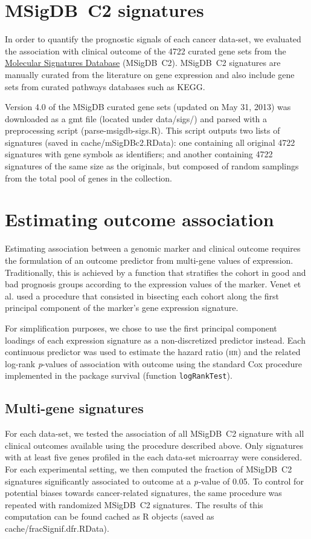 \section{\mbox{MSigDB C2} signatures}
In order to quantify the prognostic signals of each cancer data-set, we
evaluated the association with clinical outcome of the 4722 curated gene sets
from the \href{http://www.broadinstitute.org/gsea/msigdb/index.jsp}{Molecular
  Signatures Database} (\mbox{MSigDB C2}).  \mbox{MSigDB C2} signatures are
manually curated from the literature on gene expression and also include gene
sets from curated pathways databases such as KEGG.\@

Version 4.0 of the MSigDB curated gene sets (updated on May 31, 2013) was
downloaded as a \textsf{gmt} file (located under \textsf{data/sigs/}) and parsed
with a preprocessing script (\textsf{parse-msigdb-sigs.R}).  This script outputs
two lists of signatures (saved in \textsf{cache/mSigDBc2.RData}): one containing
all original 4722 signatures with gene symbols as identifiers; and another
containing 4722 signatures of the same size as the originals, but composed of
random samplings from the total pool of genes in the collection.

\section{Estimating outcome association}

Estimating association between a genomic marker and clinical outcome requires
the formulation of an outcome predictor from multi-gene values of expression.
Traditionally, this is achieved by a function that stratifies the cohort in good
and bad prognosis groups according to the expression values of the marker.
Venet et al.\cite{venet_most_2011} used a procedure that consisted in bisecting
each cohort along the first principal component of the marker's gene expression
signature.

For simplification purposes, we chose to use the first principal component
loadings of each expression signature as a non-discretized predictor instead.
Each continuous predictor was used to estimate the hazard ratio (\textsc{hr})
and the related log-rank \emph{p}-values of association with outcome using the
standard Cox procedure implemented in the package \textsf{survival} (function
\texttt{logRankTest}).

\subsection{Multi-gene signatures}
For each data-set, we tested the association of all \mbox{MSigDB C2} signature
with all clinical outcomes available using the procedure described above.  Only
signatures with at least five genes profiled in the each data-set microarray
were considered.  For each experimental setting, we then computed the fraction
of \mbox{MSigDB C2} signatures significantly associated to outcome at a
\emph{p-}value of 0.05.  To control for potential biases towards cancer-related
signatures, the same procedure was repeated with randomized \mbox{MSigDB C2}
signatures.  The results of this computation can be found cached as \textsf{R}
objects (saved as \textsf{cache/fracSignif.dfr.RData}).

